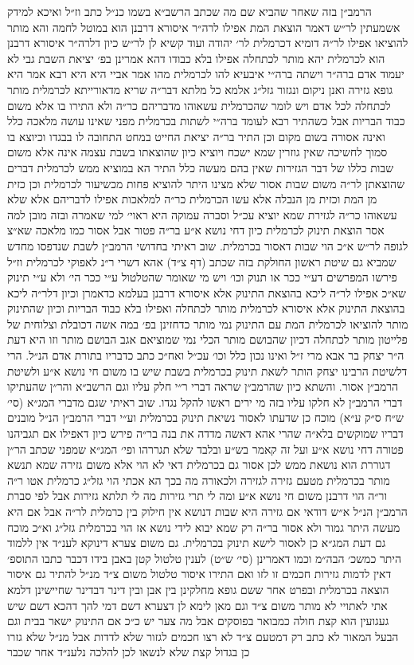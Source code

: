 \documentclass[12pt, openany]{book}
\begin{document}
\begin{multicols}{2}
הרמב״ן בזה שאחר שהביא שם מה שכתב הרשב״א בשמו כנ״ל כתב וז״ל ואיכא למידק אשמעתין לר״ש דאמר הוצאת המת אפילו לרה״ר איסורא דרבנן הוא במוטל לחמה והא מותר להוציאו אפילו לר״ה דומיא דכרמלית לר׳ יהודה ועוד קשיא לן לר״ש כיון דלרה״ר איסורא דרבנן הוא לכרמלית יהא מותר לכתחלה אפילו בלא כבודו דהא אמרינן בפ׳ יציאת השבת גבי לא יעמוד אדם ברה״ר וישתה ברה״י איבעיא להו לכרמלית מהו אמר אביי היא היא רבא אמר היא גופא גזירה ואנן ניקום ונגזור גזל״ג אלמא כל מלתא דבר״ה שריא מדאורייתא לכרמלית מותר לכתחלה לכל אדם ויש לומר שהכרמלית עשאוהו מדבריהם כר״ה ולא התירו בו אלא משום כבוד הבריות אבל כשהתיר רבא לעומד ברה״י לשתות בכרמלית מפני שאינו עושה מלאכה כלל ואינה אסורה בשום מקום וכן התיר בר״ה יציאת החייט במחט התחובה לו בבגדו וכיוצא בו סמוך לחשיכה שאין גוזרין שמא ישכח ויוציא כיון שהוצאתו בשבת עצמה אינה אלא משום שבות כללו של דבר הגזירות שאין בהם מעשה כלל התיר הא במוציא ממש לכרמלית דברים שהוצאתן לר״ה משום שבות אסור שלא מצינו היתר להוציא פחות מכשיעור לכרמלית וכן כזית מן המת וכזית מן הנבלה אלא עשו הכרמלית כר״ה למלאכות אפילו לדבריהם אלא שלא עשאוהו כר״ה לגזירת שמא יוציא עכ״ל וסברה עמוקה היא ראוי׳ למי שאמרה ובזה מובן למה אסר הוצאת תינוק לכרמלית כיון דחי נושא א״ע בר״ה פטור אבל אסור כמו מלאכה שא״צ לגופה לר״ש א״כ הוי שבות דאסור בכרמלית. שוב ראיתי בחדושי הרמב״ן לשבת שנדפסו מחדש שמביא גם שיטת ראשון החולקת בזה שכתב (דף צ״ד) אהא דשרי ר״נ לאפוקי לכרמלית וז״ל פירשו המפרשים דע״י ככר או תנוק וכו׳ ויש מי שאומר שהטלטול ע״י ככר הי׳ ולא ע״י תינוק שא״כ אפילו לר״ה ליכא בהוצאת התינוק אלא איסורא דרבנן בעלמא כדאמרן וכיון דלר״ה ליכא בהוצאת התינוק אלא איסורא לכרמלית מותר לכתחלה ואפילו בלא כבוד הבריות וכיון שהתינוק מותר להוציאו לכרמלית המת עם התינוק נמי מותר כדחזינן בפ׳ במה אשה דכובלת וצלוחית של פלייטון מותר לכתחלה דכיון שהבושם מותר הכלי נמי שמוציאם אגב הבושם מותר וזו היא דעת ה״ר יצחק בר אבא מרי ז״ל ואינו נכון כלל וכו׳ עכ״ל ואח״כ כתב כדבריו בתורת אדם הנ״ל. הרי דלשיטת הרבינו יצחק הותר לשאת תינוק בכרמלית בשבת שיש בו משום חי נושא א״ע ולשיטת הרמב״ן אסור. והשתא כיון שהרמב״ן שראה דברי ר״י חלק עליו וגם הרשב״א והר״ן שהעתיקו דברי הרמב״ן לא חלקו עליו בזה מי ירים ראשו להקל נגדו. שוב ראיתי שגם מדברי המג״א (סי׳ ש״ח ס״ק ע״א) מוכח כן שדעתו לאסור נשיאת תינוק בכרמלית וע״י דברי הרמב״ן הנ״ל מובנים דבריו שמוקשים בלא״ה שהרי אהא דאשה מדדה את בנה בר״ה פירש כיון דאפילו אם תגביהנו פטורה דחי נושא א״ע ועל זה קאמר בש״ע ובלבד שלא תגררהו ופי׳ המג״א שמפני שכתב הר״ן דגוררת הוא נושאת ממש לכן אסור גם בכרמלית דאי לא הוי אלא משום גזירה שמא תנשא מותר בכרמלית מטעם גזירה לגזירה ולכאורה מה בכך הא אכתי הוי גזל״ג כרמלית אטו ר״ה ור״ה הוי דרבנן משום חי נושא א״ע ומה לי תרי גזירות מה לי תלתא גזירות אבל לפי סברת הרמב״ן הנ״ל א״ש דודאי אם גזירה היא שבות דנושא אין חילוק בין כרמלית לר״ה אבל אם היא מעשה היתר גמור ולא אסור בר״ה רק שמא יבוא לידי נושא אז הוי בכרמלית גזל״ג וא״כ מוכח גם דעת המג״א כן לאסור לישא תינוק בכרמלית. גם משום צערא דינוקא לענ״ד אין ללמוד היתר כמשכ׳ הבה״מ וכמו דאמרינן (סי׳ ש״ט) לענין טלטול קטן באבן בידו דכבר כתבו התוספ׳ דאין לדמות גזירות חכמים זו לזו ואם התירו איסור טלטול משום צ״ד מנ״ל להתיר גם איסור הוצאה בכרמלית ובפרט אחר ששם גופא מחלקינן בין אבן ובין דינר דבדינר שחיישינן דלמא אתי לאתויי לא מותר משום צ״ד וגם מאן לימא לן דצערא דשם דמי להך דהכא דשם שיש געגועין הוא קצת חולה כמבואר בפוסקים אבל מה צער יש כ״כ אם התינוק ישאר בבית וגם הבעל המאור לא כתב רק דמטעם צ״ד לא רצו חכמים לגזור שלא לדדות אבל מנ״ל שלא גזרו כן בגדול קצת שלא לנשאו לכן להלכה נלענ״ד אחר שכבר 
\end{multicols}
\end{document}
